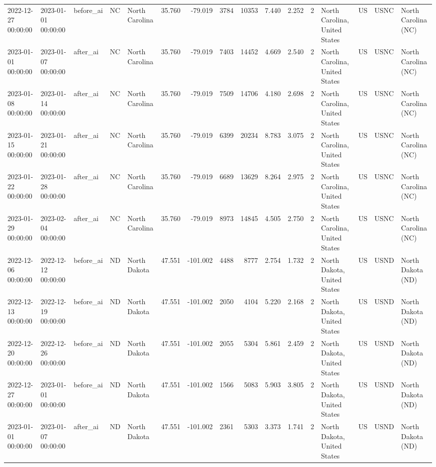 \begin{tabular}{lllllrrrrrrlllll}
2022-12-27 00:00:00 & 2023-01-01 00:00:00 & before\_ai & NC & North Carolina & 35.760 & -79.019 & 3784 & 10353 & 7.440 & 2.252 & 2 & North Carolina, United States & US & USNC & North Carolina (NC) \\
2023-01-01 00:00:00 & 2023-01-07 00:00:00 & after\_ai & NC & North Carolina & 35.760 & -79.019 & 7403 & 14452 & 4.669 & 2.540 & 2 & North Carolina, United States & US & USNC & North Carolina (NC) \\
2023-01-08 00:00:00 & 2023-01-14 00:00:00 & after\_ai & NC & North Carolina & 35.760 & -79.019 & 7509 & 14706 & 4.180 & 2.698 & 2 & North Carolina, United States & US & USNC & North Carolina (NC) \\
2023-01-15 00:00:00 & 2023-01-21 00:00:00 & after\_ai & NC & North Carolina & 35.760 & -79.019 & 6399 & 20234 & 8.783 & 3.075 & 2 & North Carolina, United States & US & USNC & North Carolina (NC) \\
2023-01-22 00:00:00 & 2023-01-28 00:00:00 & after\_ai & NC & North Carolina & 35.760 & -79.019 & 6689 & 13629 & 8.264 & 2.975 & 2 & North Carolina, United States & US & USNC & North Carolina (NC) \\
2023-01-29 00:00:00 & 2023-02-04 00:00:00 & after\_ai & NC & North Carolina & 35.760 & -79.019 & 8973 & 14845 & 4.505 & 2.750 & 2 & North Carolina, United States & US & USNC & North Carolina (NC) \\
2022-12-06 00:00:00 & 2022-12-12 00:00:00 & before\_ai & ND & North Dakota & 47.551 & -101.002 & 4488 & 8777 & 2.754 & 1.732 & 2 & North Dakota, United States & US & USND & North Dakota (ND) \\
2022-12-13 00:00:00 & 2022-12-19 00:00:00 & before\_ai & ND & North Dakota & 47.551 & -101.002 & 2050 & 4104 & 5.220 & 2.168 & 2 & North Dakota, United States & US & USND & North Dakota (ND) \\
2022-12-20 00:00:00 & 2022-12-26 00:00:00 & before\_ai & ND & North Dakota & 47.551 & -101.002 & 2055 & 5304 & 5.861 & 2.459 & 2 & North Dakota, United States & US & USND & North Dakota (ND) \\
2022-12-27 00:00:00 & 2023-01-01 00:00:00 & before\_ai & ND & North Dakota & 47.551 & -101.002 & 1566 & 5083 & 5.903 & 3.805 & 2 & North Dakota, United States & US & USND & North Dakota (ND) \\
2023-01-01 00:00:00 & 2023-01-07 00:00:00 & after\_ai & ND & North Dakota & 47.551 & -101.002 & 2361 & 5303 & 3.373 & 1.741 & 2 & North Dakota, United States & US & USND & North Dakota (ND) \\

\end{tabular}
